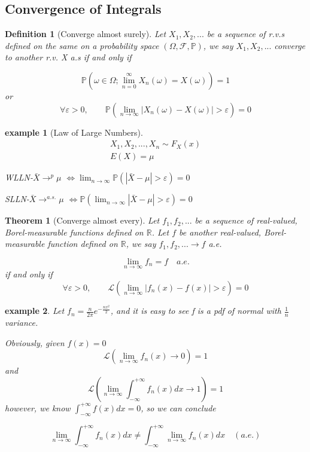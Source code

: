 \documentclass[a4]{article}
\newtheorem{theorem}{Theorem}
\newtheorem{definition}{Definition}
\newtheorem{example}{example}
\begin{document}
\subsection{Convergence of Integrals}
\begin{definition}[Converge almost surely]
	\quad \bigbreak 
	Let $X_{1}, X_{2},...$ be a sequence of r.v.s defined on the same on a probability space $(\Omega, \mathcal{F}, \mathbb{P})$, we say  $X_{1}, X_{2},...$ converge to another r.v. X a.s if and only if \par 
	$$
	\mathbb{P}(\omega\in \Omega ; \lim_{n = 0}^{\infty}X_{n}(\omega)= X(\omega)) = 1
	$$
	or 
	$$
	\forall \varepsilon>0, \quad \quad \mathbb
	P(\lim_{n\rightarrow \infty} |X_{n}(\omega)-X(\omega)|>\varepsilon ) = 0
	$$
\end{definition}
\begin{example}[Law of Large Numbers]
	\quad \par 
	$$
	\begin{aligned}
	X_{1}, X_{2}, ...,X_{n}\sim F_{X}(x)\\
	E(X) = \mu
	\end{aligned}
	$$\par 
	WLLN-$\bar X \rightarrow^{p}\mu$ $\Leftrightarrow \lim_{n\rightarrow\infty}\mathbb{P}(|\bar X-\mu|>\varepsilon) = 0$\par 
	\quad \par 
	SLLN-$\bar X \rightarrow^{a.s.}\mu$ $\Leftrightarrow \mathbb{P}(\lim_{n\rightarrow\infty}|\bar X-\mu|>\varepsilon) = 0$\par 

\end{example}
\begin{theorem}[Converge almost every]
	\quad \par \bigbreak
	Let $f_{1}, f_{2},...$ be a sequence of real-valued, Borel-measurable functions defined on $\mathbb{R}$. Let $f$ be another real-valued, Borel-measurable function defined on $\mathbb{R}$, we say $f_{1}, f_{2},...\rightarrow f $ a.e. \par 
	$$
	\lim_{n\rightarrow \infty}f_{n} = f \quad a.e.
	$$
	if and only if $$
	\forall \varepsilon>0, \quad \quad \mathcal{L}(\lim_{n\rightarrow \infty} |f_{n}(x)-f(x)|>\varepsilon ) = 0
	$$
\end{theorem}
\begin{example}
	Let $f_{n} = \frac{n}{2\pi}e^{-\frac{nx^{2}}{2}}$, and it is easy to see f is a pdf of normal with $\frac{1}{n}$ variance.\par 
	Obviously, given $f(x) = 0$
	$$
	\mathcal{L}(\lim_{n\rightarrow \infty}f_{n}(x)\rightarrow 0) = 1
	$$
	and 
	$$
		\mathcal{L}(\lim_{n\rightarrow \infty}\int^{+\infty}_{-\infty}f_{n}(x) dx\rightarrow 1) = 1
	$$
	however, we know $\int^{+\infty}_{-\infty} f(x) dx = 0$, so we can conclude\par 
	$$
\lim_{n\rightarrow \infty}\int^{+\infty}_{-\infty}f_{n}(x) dx \neq \int^{+\infty}_{-\infty}\lim_{n\rightarrow \infty}f_{n}(x) dx\quad (a.e.)
	$$
\end{example}
\end{document}
